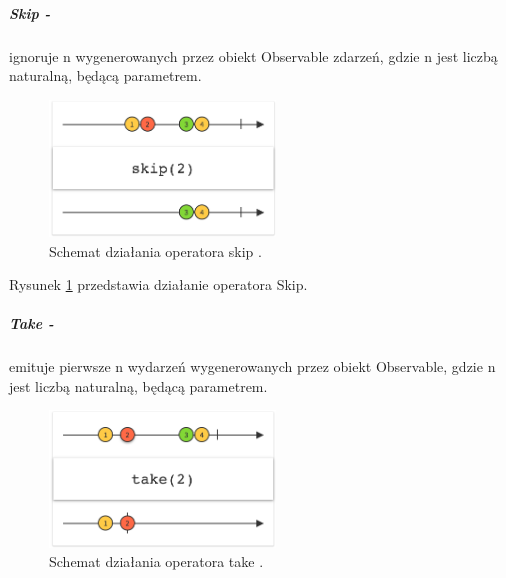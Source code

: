 \documentclass[12pt,oneside,a4paper]{report}
\begin{document}
\subparagraph{Skip -}ignoruje n wygenerowanych przez obiekt Observable zdarzeń, gdzie n jest liczbą naturalną, będącą parametrem.
\begin{figure}[ht!]
	\centering
	\includegraphics[width=6cm]{skip}
	\caption{Schemat działania operatora skip \cite{marbles}.}
	\label{skip}
\end{figure}
Rysunek \ref{skip} przedstawia działanie operatora Skip.
\subparagraph{Take -}emituje pierwsze n wydarzeń wygenerowanych przez obiekt Observable, gdzie n jest liczbą naturalną, będącą parametrem.
\begin{figure}[ht!]
	\centering
	\includegraphics[width=6cm]{take}
	\caption{Schemat działania operatora take \cite{marbles}.}
	\label{take}
\end{figure}

\pagebreak
\end{document}

